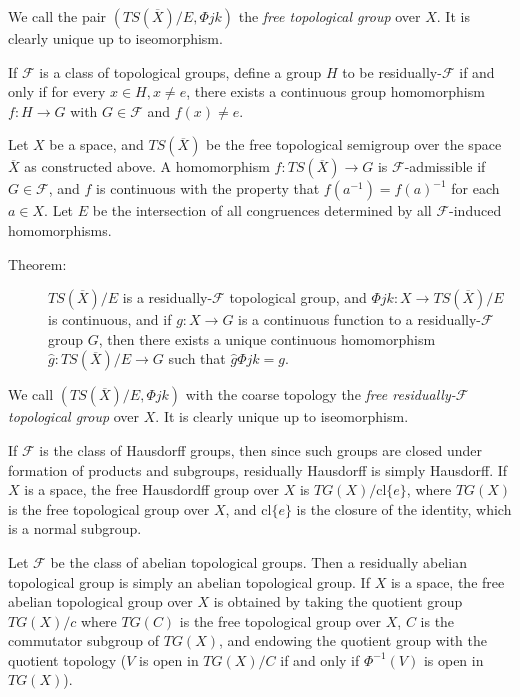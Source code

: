 \documentclass{article}
\begin{document}
We call the pair $(TS(\overline{X})/E, \Phi jk)$ the \emph{free topological group} over $X$. It is clearly unique up to iseomorphism.

If $\mathcal{F}$ is a class of topological groups, define a group $H$ to be residually-$\mathcal{F}$ if and only if for every $x \in H, x \ne e$, there exists a continuous group homomorphism $f: H \rightarrow G$ with $G \in \mathcal{F}$ and $f(x) \ne e$.

Let $X$ be a space, and $TS(\overline{X})$ be the free topological semigroup over the space $\overline{X}$ as constructed above. A homomorphism $f: TS(\overline{X}) \rightarrow G$ is $\mathcal{F}$-admissible if $G \in \mathcal{F}$, and $f$ is continuous with the property that $f(a^{-1}) = f(a)^{-1}$ for each $a \in X$. Let $E$ be the intersection of all congruences determined by all $\mathcal{F}$-induced homomorphisms.

\begin{description}

\item[Theorem:] $TS(\overline{X})/E$ is a residually-$\mathcal{F}$ topological group, and $\Phi jk: X \rightarrow TS(\overline{X})/E$ is continuous, and if $g: X \rightarrow G$ is a continuous function to a residually-$\mathcal{F}$ group $G$, then there exists a unique continuous homomorphism $\hat{g}: TS(\overline{X})/E \rightarrow G$ such that $\hat{g} \Phi jk = g$.

\end{description}

We call $(TS(\overline{X})/E, \Phi jk)$ with the coarse topology the \emph{free residually-$\mathcal{F}$ topological group} over $X$. It is clearly unique up to iseomorphism.

If $\mathcal{F}$ is the class of Hausdorff groups, then since such groups are closed under formation of products and subgroups, residually Hausdorff is simply Hausdorff. If $X$ is a space, the free Hausdordff group over $X$ is $TG(X)/ \text{cl} \{ e \}$, where $TG(X)$ is the free topological group over $X$, and $\text{cl} \{ e \}$ is the closure of the identity, which is a normal subgroup.

Let $\mathcal{F}$ be the class of abelian topological groups. Then a residually abelian topological group is simply an abelian topological group. If $X$ is a space, the free abelian topological group over $X$ is obtained by taking the quotient group $TG(X)/c$ where $TG(C)$ is the free topological group over $X$, $C$ is the commutator subgroup of $TG(X)$, and endowing the quotient group with the quotient topology ($V$ is open in $TG(X)/C$ if and only if $\Phi^{-1}(V)$ is open in $TG(X)$).
\end{document}
